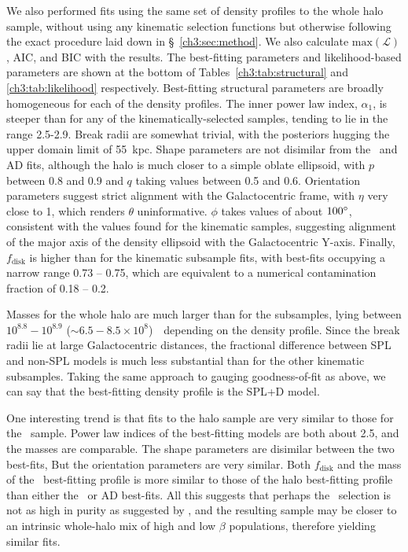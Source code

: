 We also performed fits using the same set of density profiles to the whole halo sample, without using any kinematic selection functions but otherwise following the exact procedure laid down in \S~\ref{ch3:sec:method}. We also calculate $\mathrm{max}(\mathcal{L})$, AIC, and BIC with the results. The best-fitting parameters and likelihood-based parameters are shown at the bottom of Tables~\ref{ch3:tab:structural} and \ref{ch3:tab:likelihood} respectively. Best-fitting structural parameters are broadly homogeneous for each of the density profiles. The inner power law index, $\alpha_{1}$, is steeper than for any of the kinematically-selected samples, tending to lie in the range 2.5-2.9. Break radii are somewhat trivial, with the posteriors hugging the upper domain limit of 55~kpc. Shape parameters are not disimilar from the \eLz\ and AD fits, although the halo is much closer to a simple oblate ellipsoid, with $p$ between 0.8 and 0.9 and $q$ taking values between 0.5 and 0.6. Orientation parameters suggest strict alignment with the Galactocentric frame, with $\eta$ very close to 1, which renders $\theta$ uninformative. $\phi$ takes values of about $100\hbox{$^\circ$}$, consistent with the values found for the kinematic samples, suggesting alignment of the major axis of the density ellipsoid with the Galactocentric Y-axis. Finally, $f_\mathrm{disk}$ is higher than for the kinematic subsample fits, with best-fits occupying a narrow range 0.73 -- 0.75, which are equivalent to a numerical contamination fraction of 0.18 -- 0.2.

Masses for the whole halo are much larger than for the \gse subsamples, lying between $10^{8.8}-10^{8.9}$ ($\sim 6.5-8.5\times10^{8}$)~\Msun\ depending on the density profile. Since the break radii lie at large Galactocentric distances, the fractional difference between SPL and non-SPL models is much less substantial than for the other kinematic subsamples. Taking the same approach to gauging goodness-of-fit as above, we can say that the best-fitting density profile is the SPL+D model.

One interesting trend is that fits to the halo sample are very similar to those for the \JRLz\ sample. Power law indices of the best-fitting models are both about 2.5, and the masses are comparable. The shape parameters are disimilar between the two best-fits, But the orientation parameters are very similar. Both $f_\mathrm{disk}$ and the mass of the \JRLz\ best-fitting profile is more similar to those of the halo best-fitting profile than either the \eLz\ or AD best-fits. All this suggests that perhaps the \JRLz\ selection is not as high in purity as suggested by \cite{lane22}, and the resulting sample may be closer to an intrinsic whole-halo mix of high and low $\beta$ populations, therefore yielding similar fits.


